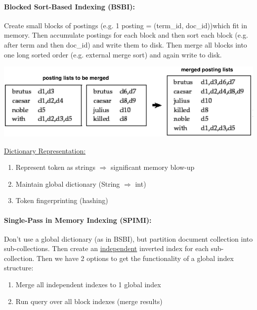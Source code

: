 \documentclass[a4paper,11pt]{article}
\begin{document}
\begin{multicols}{2}
\paragraph{Blocked Sort-Based Indexing (BSBI):} Create small blocks of postings (e.g. 1 posting = (term\_id, doc\_id))which fit in memory. Then accumulate postings for each block and then sort each block (e.g. after term and then doc\_id) and write them to disk. Then merge all blocks into one long sorted order (e.g. external merge sort) and again write to disk.\\
\vspace{-0.8cm}\hspace{2cm}
\begin{center}
  \includegraphics[width=0.7\columnwidth]{bsbi.png}
\end{center}
\vspace{-0.3cm}
\underline{Dictionary Representation:}
\begin{enumerate}
  \item Represent token as strings $\Rightarrow$ significant memory blow-up
  \item Maintain global dictionary (String $\Rightarrow$ int)
  \item Token fingerprinting (hashing)
\end{enumerate}

\paragraph{Single-Pass in Memory Indexing (SPIMI):} Don't use a global dictionary (as in BSBI), but partition document collection into sub-collections. Then create an \underline{independent} inverted index for each sub-collection. Then we have 2 options to get the functionality of a global index structure:
\begin{enumerate}
  \item Merge all independent indexes to 1 global index
  \item Run query over all block indexes (merge results)
\end{enumerate}


\end{multicols}
\end{document}
